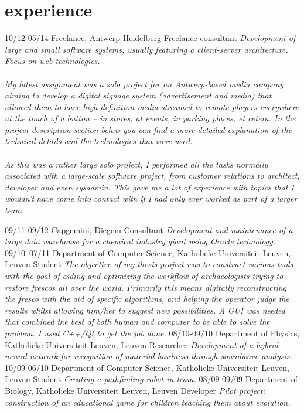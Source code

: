 \documentclass[]{friggeri-cv}
\begin{document}
\section{experience}

\begin{entrylist}
  \entry
    {10/12-05/14}
    {Freelance, Antwerp-Heidelberg}
    {Freelance consultant}
    {\emph{Development of large and small software systems, usually featuring a client-server architecture. Focus on web technologies. \\\\ My latest assignment was a solo project for an Antwerp-based media company aiming to develop a digital signage system (advertisement and media) that allowed them to have high-definition media streamed to remote players everywhere at the touch of a button -- in stores, at events, in parking places, et cetera. In the project description section below you can find a more detailed explanation of the technical details and the technologies that were used. \\\\ As this was a rather large solo project, I performed all the tasks normally associated with a large-scale software project, from customer relations to architect, developer and even sysadmin. This gave me a lot of experience with topics that I wouldn't have come into contact with if I had only ever worked as part of a larger team.
    }}
\end{entrylist}


\begin{entrylist}
  \entry
    {09/11-09/12}
    {Capgemini, Diegem}
    {Consultant}
    {\emph{Development and maintenance of a large data warehouse for a chemical industry giant using Oracle technology.}}
  \entry
    {09/10--07/11}
    {Department of Computer Science, Katholieke Universiteit Leuven, Leuven}
    {Student}
    {\emph{The objective of my thesis project was to construct various tools with the goal of aiding and optimizing the workflow of archaeologists trying to restore frescos all over the world. Primarily this means digitally reconstructing the fresco with the aid of specific algorithms, and helping the operator judge the results whilst allowing him/her to suggest new possibilities. A GUI was needed that combined the best of both human and computer to be able to solve the problem. I used C++/Qt to get the job done.}}
  \entry
    {08/10-09/10}
    {Department of Physics, Katholieke Universiteit Leuven, Leuven}
    {Researcher}
    {\emph{Development of a hybrid neural network for recognition of material hardness through soundwave analysis.}}
  \entry
    {10/09-06/10}
    {Department of Computer Science, Katholieke Universiteit Leuven, Leuven}
    {Student}
    {\emph{Creating a pathfinding robot in team.}}
  \entry
    {08/09-09/09}
    {Department of Biology, Katholieke Universiteit Leuven, Leuven}
    {Developer}
    {\emph{Pilot project: construction of an educational game for children teaching them about evolution.}}
\end{entrylist}
\end{document}
